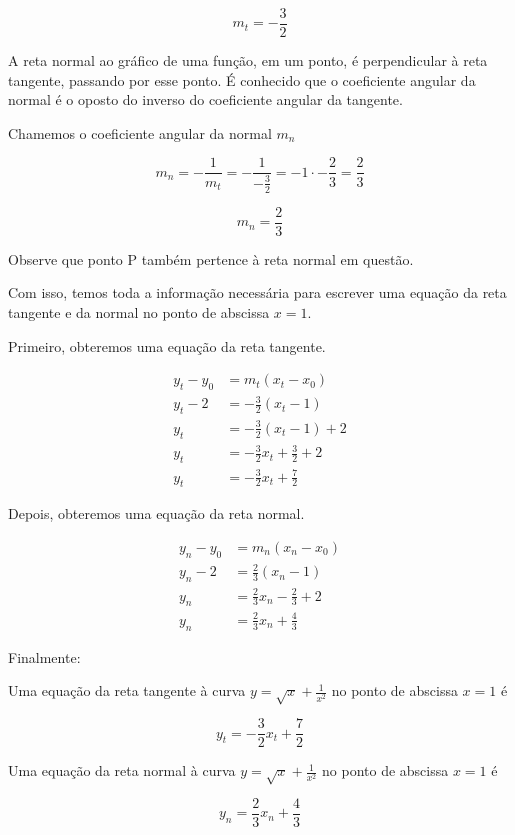 \documentclass{article}
\begin{document}
\begin{equation}\label{eq:q6_mt}
    m_t = -\frac{3}{2}
\end{equation}

A reta normal ao gráfico de uma função, em um ponto,
é perpendicular à reta tangente, passando por esse ponto. 
É conhecido que o coeficiente angular da normal é o
oposto do inverso do coeficiente angular da tangente.

Chamemos o coeficiente angular da normal \(m_n\)

\[
m_n 
= - \frac{1}{m_t} 
= - \frac{1}{- \frac{3}{2}}
= - 1 \cdot -\frac{2}{3}
= \frac{2}{3} 
\]

\begin{equation}
    m_n = \frac{2}{3} 
\end{equation}

Observe que ponto P também pertence à reta normal em questão.

Com isso, temos toda a informação necessária para escrever uma equação
da reta tangente e da normal no ponto de abscissa \(x=1\).

Primeiro, obteremos uma equação da reta tangente.

\begin{align*}
    y_t - y_0 
    &= m_t (x_t - x_0)
    \\
    y_t - 2
    &= -\frac{3}{2} (x_t - 1)
    \\
    y_t 
    &= -\frac{3}{2} (x_t - 1) + 2
    \\
    y_t 
    &= -\frac{3}{2}x_t + \frac{3}{2} + 2
    \\
    y_t 
    &= -\frac{3}{2}x_t + \frac{7}{2}
\end{align*}

Depois, obteremos uma equação da reta normal.

\begin{align*}
    y_n - y_0 
    &= m_n (x_n - x_0)
    \\
    y_n - 2
    &= \frac{2}{3} (x_n - 1)
    \\
    y_n
    &= \frac{2}{3} x_n - \frac{2}{3} + 2
    \\
    y_n
    &= \frac{2}{3} x_n + \frac{4}{3}
\end{align*}

Finalmente:

Uma equação da reta tangente à curva \(y = \sqrt{x} + \frac{1}{x^2}\)
no ponto de abscissa \(x=1\) é

\[
    y_t 
    = -\frac{3}{2}x_t + \frac{7}{2}
\]

Uma equação da reta normal à curva \(y = \sqrt{x} + \frac{1}{x^2}\)
no ponto de abscissa \(x=1\) é

\[
    y_n
    = \frac{2}{3} x_n + \frac{4}{3}    
\]
\end{document}

